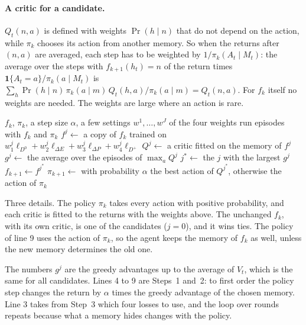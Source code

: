 \documentclass[11pt]{article}
\theoremstyle{definition}
\newcommand{\dE}{\Delta E}
\newcommand{\dP}{\Delta P}
\begin{document}
\paragraph{A critic for a candidate.} $Q_t(n,a)$ is defined with weights $\Pr(h\mid n)$ that do not depend on the action, while $\pi_k$ chooses its action from another memory. So when the returns after $(n,a)$ are averaged, each step has to be weighted by $1/\pi_k(A_t\mid M_t)$: the average over the steps with $f_{k+1}(h_t)=n$ of the return times $\mathbf 1\{A_t=a\}/\pi_k(a\mid M_t)$ is $\sum_h\Pr(h\mid n)\,\pi_k(a\mid m)\,Q_t(h,a)/\pi_k(a\mid m)=Q_t(n,a)$. For $f_k$ itself no weights are needed. The weights are large where an action is rare.

\begin{algorithm}[h]
\caption{One round of the agent}\label{alg:round}
\begin{algorithmic}[1]
\Require $f_k$, $\pi_k$, a step size $\alpha$, a few settings $w^1,\dots,w^J$ of the four weights
\State run episodes with $f_k$ and $\pi_k$
  \State $f^j\gets$ a copy of $f_k$ trained on $w^j_1\ell_{D^0}+w^j_2\ell_{\dE}+w^j_3\ell_{\dP}+w^j_4\ell_{D^+}$
  \State $Q^j\gets$ a critic fitted on the memory of $f^j$
  \State $g^j\gets$ the average over the episodes of $\max_aQ^j$
\EndFor
\State $j^*\gets$ the $j$ with the largest $g^j$
\State $f_{k+1}\gets f^{j^*}$
\State $\pi_{k+1}\gets$ with probability $\alpha$ the best action of $Q^{j^*}$, otherwise the action of $\pi_k$
\end{algorithmic}
\end{algorithm}

Three details. The policy $\pi_k$ takes every action with positive probability, and each critic is fitted to the returns with the weights above. The unchanged $f_k$, with its own critic, is one of the candidates ($j=0$), and it wins ties. The policy of line 9 uses the action of $\pi_k$, so the agent keeps the memory of $f_k$ as well, unless the new memory determines the old one.

The numbers $g^j$ are the greedy advantages up to the average of $V_t$, which is the same for all candidates. Lines 4 to 9 are Steps~1 and~2: to first order the policy step changes the return by $\alpha$ times the greedy advantage of the chosen memory. Line 3 takes from Step~3 which four losses to use, and the loop over rounds repeats because what a memory hides changes with the policy.
\end{document}
